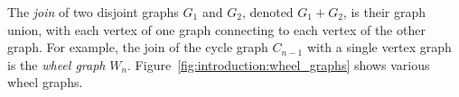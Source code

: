 The \emph{join} of two disjoint graphs $G_1$ and
$G_2$, denoted $G_1 + G_2$, is their graph union, with each vertex of
one graph connecting to each vertex of the other graph. For example,
the join of the cycle graph $C_{n-1}$ with a single vertex graph is
the \emph{wheel graph}
$W_n$. Figure~\ref{fig:introduction:wheel_graphs} shows
various wheel graphs.

\begin{figure}[!htbp]
\centering
{}
\quad
{}
\quad
{}
\end{figure}
